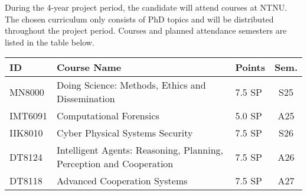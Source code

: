 During the 4-year project period, the candidate will attend courses at NTNU. The chosen curriculum only consists of PhD topics and will be distributed throughout the project period. Courses and planned attendance semesters are listed in the table below.
\begin{center}
	\begin{tabular}{|l|p{8cm}|p{1cm}|c|}
		\hline
		\cellcolor{blue!10}\textbf{ID} 
			& \cellcolor{blue!10}\textbf{Course Name} 
			& \cellcolor{blue!10}\textbf{Points}
			& \cellcolor{blue!10}\textbf{Sem.}\\
		\hline
		MN8000
			& Doing Science: Methods, Ethics and Dissemination & 7.5 SP & S25 \\
		\hline
		IMT6091	& Computational Forensics & 5.0 SP & A25 \\
		\hline
		IIK8010 & Cyber Physical Systems Security & 7.5 SP & S26 \\
		\hline
		DT8124& Intelligent Agents: Reasoning, Planning, Perception and Cooperation	& 7.5 SP & A26 \\
		\hline
		DT8118 & Advanced Cooperation Systems & 7.5 SP & A27 \\
		\hline
\end{tabular}\\	
\end{center}
